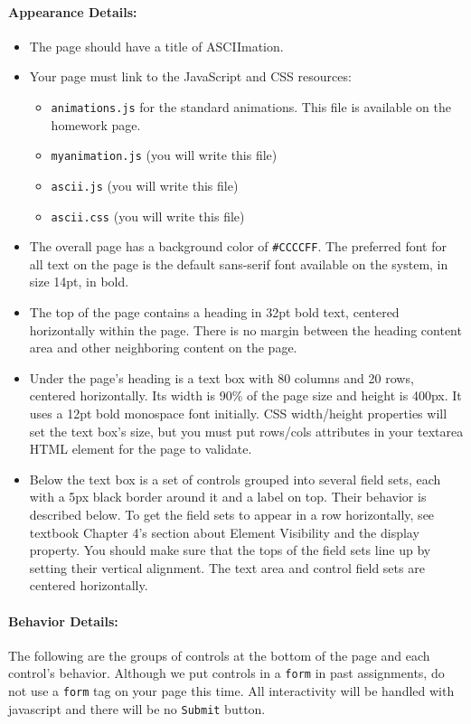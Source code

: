 \documentclass{article}
\newcommand{\myitem}{\paragraph}
\begin{document}
\myitem{Appearance Details:}
\begin{itemize}
\item
  The page should have a title of
  ASCIImation.
\item
  Your page must link to the JavaScript and CSS resources:
\begin{itemize}
  \item
 {\tt animations.js} for the standard animations.  This file is
 available on the homework page.
\item
  {\tt myanimation.js} (you will write this file)
\item {\tt ascii.js} (you will write
  this file)
\item {\tt ascii.css} (you will write this file)
\end{itemize}
\item
 The overall page has a background color of
{\tt \#CCCCFF}. The preferred font for all text on the page is the default
sans-serif font available on the system, in size 14pt, in bold.
\item
The
top of the page contains a heading in 32pt bold text, centered
horizontally within the page. There is no margin between the heading
content area and other neighboring content on the page.
\item
Under the
page's heading is a text box with 80 columns and 20 rows, centered
horizontally.  Its width is 90\% of the page size and height is 400px.
It uses a 12pt bold monospace font initially.  CSS width/height
properties will set the text box's size, but you must put rows/cols
attributes in your textarea HTML element for the page to validate.
\item
Below the text box is a set of controls grouped into several field
sets, each with a 5px black border around it and a label on top.
Their behavior is described below.  To get the field sets to appear in
a row horizontally, see textbook Chapter 4's section about Element
Visibility and the display property.  You should make sure that the
tops of the field sets line up by setting their vertical alignment.
The text area and control field sets are centered horizontally.
\end{itemize}

\myitem{Behavior Details:} The following are the groups of controls at
the bottom of the page and each control's behavior.  Although
we put controls in a {\tt form} in past assignments, do not use a {\tt form}
tag on your page this time.  All interactivity will be handled with
javascript and there will be no {\tt Submit} button.
\end{document}
